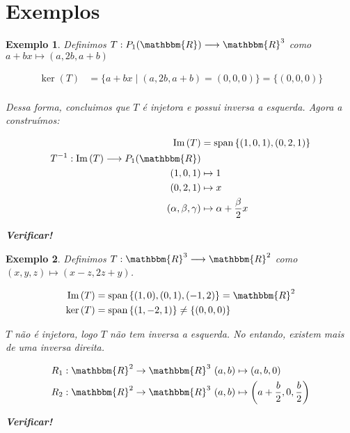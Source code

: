 \documentclass{article}
\newcommand{\REAL} {\mathbbm{R}}
\newcommand{\kernel}[1] {\ker \left( #1 \right)}
\newcommand{\imagem}[1] {\text{Im} \left( #1 \right)}
\newcommand{\Span}[1] {\text{span} \left\{ #1 \right\}}
\newcommand{\deffunc}[3] {#1: #2 \longrightarrow #3}
\newtheorem{example}{Exemplo}[section]
\begin{document}
    \section{Exemplos}
        \begin{example}
            Definimos $\deffunc{T}{P_1(\REAL)}{\REAL^3}$ como $a + bx \mapsto (a, 2b, a + b)$

            \begin{align*}
                \kernel{T} &= \{a + bx \mid (a, 2b, a + b) = (0, 0, 0)\} = \{(0, 0, 0)\}\\
            \end{align*}

            Dessa forma, concluimos que $T$ é injetora e possui inversa a esquerda. Agora a construímos:

            \begin{align*}
                \imagem{T} &= \Span{ (1, 0, 1), (0, 2, 1) }\\
                \deffunc{T^{-1}}{\imagem{T}}{P_1(\REAL)}\\
                (1, 0, 1) &\mapsto 1\\
                (0, 2, 1) &\mapsto x\\
                (\alpha, \beta, \gamma) &\mapsto \alpha + \frac{\beta}{2} x
            \end{align*}

            \textbf{Verificar!}
        \end{example}

        \begin{example}
            Definimos $\deffunc{T}{\REAL^3}{\REAL^2}$ como $(x, y, z) \mapsto (x - z, 2z + y)$.

            \begin{align*}
                \imagem{T} &= \Span{(1, 0), (0, 1), (-1, 2)} = \REAL^2\\
                \kernel{T} &= \Span{(1, -2, 1)} \neq \{(0, 0, 0)\}\\
            \end{align*}

            $T$ não é injetora, logo $T$ não tem inversa a esquerda. No entando, existem
            mais de uma inversa direita.

            \begin{align*}
                R_1 : \REAL^2 \to \REAL^3 \text{  } (a, b) &\mapsto (a, b, 0)\\
                R_2 : \REAL^2 \to \REAL^3 \text{  } (a, b) &\mapsto \left(a + \frac{b}{2}, 0, \frac{b}{2}\right)\\
            \end{align*}

            \textbf{Verificar!}
        \end{example}
\end{document}
